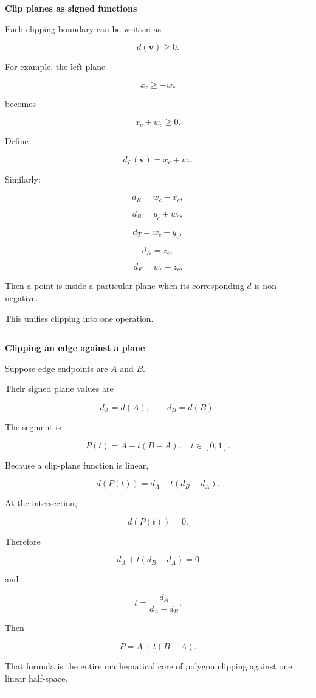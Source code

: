 \textbf{Clip planes as signed functions}

Each clipping boundary can be written as

\[
d(\mathbf v)\ge0.
\]

For example, the left plane

\[
x_c\ge-w_c
\]

becomes

\[
x_c+w_c\ge0.
\]

Define

\[
d_L(\mathbf v)=x_c+w_c.
\]

Similarly:

\[
d_R=w_c-x_c,
\]

\[
d_B=y_c+w_c,
\]

\[
d_T=w_c-y_c,
\]

\[
d_N=z_c,
\]

\[
d_F=w_c-z_c.
\]

Then a point is inside a particular plane when its corresponding \(d\) is non-negative.

This unifies clipping into one operation.

\begin{center}\rule{0.5\linewidth}{0.5pt}\end{center}

\textbf{Clipping an edge against a plane}

Suppose edge endpoints are \(A\) and \(B\).

Their signed plane values are

\[
d_A=d(A),\qquad
d_B=d(B).
\]

The segment is

\[
P(t)=A+t(B-A),\quad t\in[0,1].
\]

Because a clip-plane function is linear,

\[
d(P(t))
=
d_A+t(d_B-d_A).
\]

At the intersection,

\[
d(P(t))=0.
\]

Therefore

\[
d_A+t(d_B-d_A)=0
\]

and

\[
\boxed{
t=
\frac{d_A}{d_A-d_B}
}.
\]

Then

\[
\boxed{
P=A+t(B-A)
}.
\]

That formula is the entire mathematical core of polygon clipping against one linear half-space.

\begin{center}\rule{0.5\linewidth}{0.5pt}\end{center}

